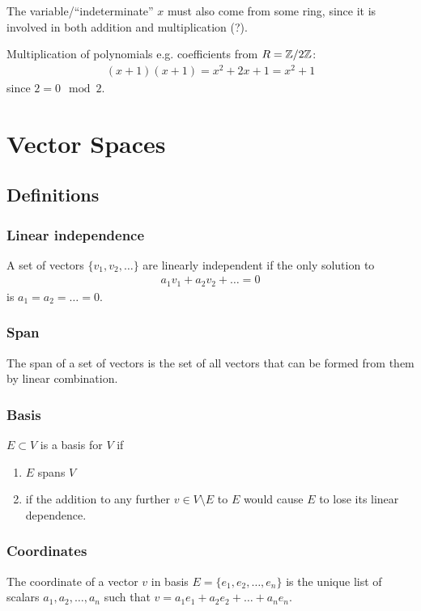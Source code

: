 The variable/``indeterminate'' $x$ must also come from some ring, since it is
involved in both addition and multiplication (?).

Multiplication of polynomials e.g. coefficients from $R = \mathbb{Z}/2\mathbb{Z}$:
\begin{align*}
(x + 1)(x + 1) = x^2 + 2x + 1 = x^2 + 1
\end{align*}
since $2 = 0 \mod 2$.

\section{Vector Spaces}

\subsection{Definitions}

\subsubsection{Linear independence}
A set of vectors $\{v_1, v_2, \ldots\}$ are linearly independent if the only
solution to
\begin{align*}
  a_1v_1 + a_2v_2 + \ldots = 0
\end{align*}
is $a_1 = a_2 = \ldots = 0$.


\subsubsection{Span}
The span of a set of vectors is the set of all vectors that can be formed from
them by linear combination.


\subsubsection{Basis}
$E \subset V$ is a basis for $V$ if
\begin{enumerate}
\item $E$ spans $V$
\item if the addition to any further $v \in V\setminus E$ to $E$ would cause
  $E$ to lose its linear dependence.
\end{enumerate}


\subsubsection{Coordinates}
The coordinate of a vector $v$ in basis $E = \{e_1, e_2, \ldots, e_n\}$ is the
unique list of scalars $a_1, a_2, \ldots, a_n$ such that
$v = a_1e_1 + a_2e_2 + \ldots + a_ne_n$.

